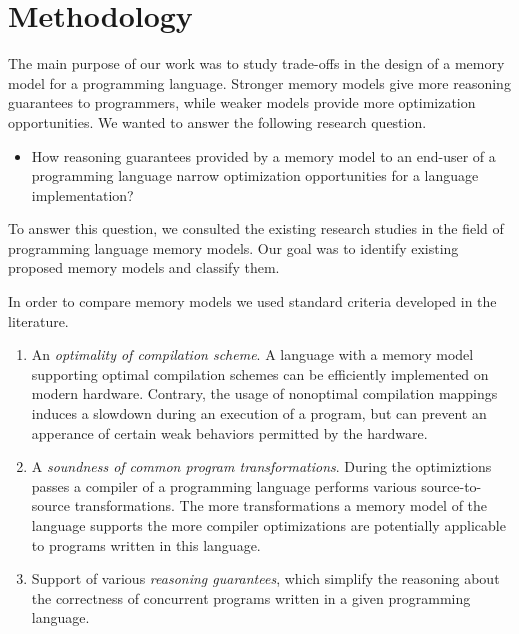 \section{Methodology}
\label{sec:methodology}

The main purpose of our work was to study 
trade-offs in the design of a memory model 
for a programming language.
Stronger memory models give more reasoning guarantees to programmers, 
while weaker models provide more optimization opportunities. 
We wanted to answer the following research question.

\begin{itemize}
  \item How reasoning guarantees provided by a memory model 
    to an end-user of a programming language narrow  
    optimization opportunities for a language implementation?
\end{itemize}

To answer this question, we consulted the existing research studies 
in the field of programming language memory models.
Our goal was to identify existing proposed memory models and classify them.

In order to compare memory models we used standard criteria developed in the literature.

\begin{enumerate}[label=\textbf{C.\arabic*}]
  
  \item \label{item:criteria:opt-comp}
    An \emph{optimality of compilation scheme}. 
    A language with a memory model supporting 
    optimal compilation schemes can be efficiently 
    implemented on modern hardware. 
    Contrary, the usage of nonoptimal compilation mappings
    induces a slowdown during an execution of a program, 
    but can prevent an apperance of certain weak behaviors
    permitted by the hardware.   

  \item \label{item:criteria:sound-trans}
    A \emph{soundness of common program transformations}. 
    During the optimiztions passes a compiler of a programming language
    performs various source-to-source transformations.
    The more transformations a memory model of the language supports
    the more compiler optimizations are potentially applicable 
    to programs written in this language.

  \item \label{item:criteria:reasoning}
    Support of various \emph{reasoning guarantees}, which simplify 
    the reasoning about the correctness of concurrent programs
    written in a given programming language. 
  
\end{enumerate}

